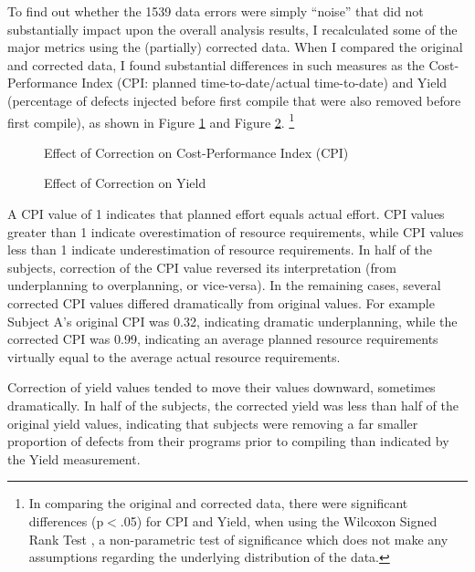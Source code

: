 To find out whether the 1539 data errors were simply ``noise'' that did not
substantially impact upon the overall analysis results, I recalculated some
of the major metrics using the (partially) corrected data.  When I compared
the original and corrected data, I found substantial differences in such
measures as the Cost-Performance Index (CPI: planned time-to-date/actual
time-to-date) and Yield (percentage of defects injected before first
compile that were also removed before first compile), as shown in Figure
\ref{fig:compareCPI} and Figure \ref{fig:compareYield}.  
\footnote{In comparing the original and corrected data, there were
  significant differences (p$<$.05) for CPI and Yield, when using the
  Wilcoxon Signed Rank Test \cite{Ferguson89}, a non-parametric test of
  significance which does not make any assumptions regarding the underlying
  distribution of the data.}

\begin{figure} [htbp]
  {\centerline{}}
  \caption{\label{fig:compareCPI}Effect of Correction on Cost-Performance
  Index (CPI)}
\end{figure}

\begin{figure} [htbp]
  {\centerline{}}
  \caption{\label{fig:compareYield}Effect of Correction on Yield}
\end{figure}

A CPI value of 1 indicates that planned effort equals actual effort. CPI
values greater than 1 indicate overestimation of resource requirements,
while CPI values less than 1 indicate underestimation of resource
requirements.  In half of the subjects, correction of the CPI value
reversed its interpretation (from underplanning to overplanning, or
vice-versa).  In the remaining cases, several corrected CPI values differed
dramatically from original values.  For example Subject A's original CPI
was 0.32, indicating dramatic underplanning, while the corrected CPI was
0.99, indicating an average planned resource requirements virtually equal
to the average actual resource requirements.

Correction of yield values tended to move their values downward, sometimes
dramatically.  In half of the subjects, the corrected yield was less than
half of the original yield values, indicating that subjects were removing a
far smaller proportion of defects from their programs prior to compiling than
indicated by the Yield measurement.

